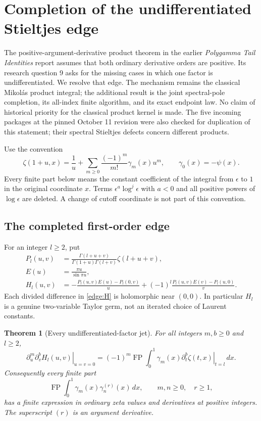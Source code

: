 \documentclass[11pt,letterpaper]{article}
\numberwithin{equation}{section}
\newtheorem{theorem}{Theorem}[section]
\theoremstyle{definition}
\theoremstyle{remark}
\begin{document}
\section{Completion of the undifferentiated Stieltjes edge}
\label{edge:sec}

The positive-argument-derivative product theorem in the earlier
\emph{Polygamma Tail Identities} report \cite{tail-polygamma} assumes that both ordinary
derivative orders are positive.  Its research question 9 asks for the
missing cases in which one factor is undifferentiated.  We resolve
that edge.  The mechanism remains the classical Mikol\'as product
integral; the additional result is the joint spectral-pole completion,
its all-index finite algorithm, and its exact endpoint law.  No claim
of historical priority for the classical product kernel is made.
The five incoming packages at the pinned October 11 revision were
also checked for duplication of this statement; their spectral
Stieltjes defects concern different products.

Use the convention
\[
 \zeta(1+u,x)=\frac1u+
       \sum_{m\ge0}\frac{(-1)^m}{m!}\gamma_m(x)u^m,
 \qquad \gamma_0(x)=-\psi(x).
\]
Every finite part below means the constant coefficient of the integral
from $\epsilon$ to $1$ in the original coordinate $x$.  Terms
$\epsilon^a\log^j\epsilon$ with $a<0$ and all positive powers of
$\log\epsilon$ are deleted.  A change of cutoff coordinate is not
part of this convention.

\subsection{The completed first-order edge}

For an integer $l\ge2$, put
\begin{align}
 P_l(u,v)&=\frac{\Gamma(l+u+v)}{\Gamma(1+u)\Gamma(l+v)}
                              \zeta(l+u+v),\\
 E(u)&=\frac{\pi u}{\sin\pi u},\\
 H_l(u,v)&=-\frac{P_l(u,v)E(u)-P_l(0,v)}u
       +(-1)^l\frac{P_l(u,v)E(v)-P_l(u,0)}v.
 \label{edge:H}
\end{align}
Each divided difference in \eqref{edge:H} is holomorphic near
$(0,0)$.  In particular $H_l$ is a genuine two-variable Taylor germ,
not an iterated choice of Laurent constants.

\begin{theorem}[Every undifferentiated-factor jet]
\label{edge:theorem}
For all integers $m,b\ge0$ and $l\ge2$,
\begin{equation}
 \left.\partial_u^m\partial_v^b H_l(u,v)\right|_{u=v=0}
 =(-1)^m\operatorname{FP}\int_0^1
    \gamma_m(x)\left.\partial_t^b\zeta(t,x)\right|_{t=l}\,dx.
 \label{edge:alljets}
\end{equation}
Consequently every finite part
\[
 \operatorname{FP}\int_0^1\gamma_m(x)\gamma_n^{(r)}(x)\,dx,
 \qquad m,n\ge0,\quad r\ge1,
\]
has a finite expression in ordinary zeta values and derivatives at
positive integers.  The superscript $(r)$ is an argument derivative.
\end{theorem}
\end{document}
